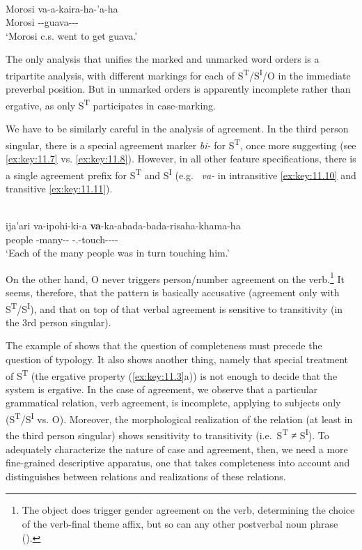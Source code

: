 \documentclass[output=paper]{langsci/langscibook}
\begin{document}
\ea%
    \label{ex:key:11.10}
    {\parencite[197]{ChapmanDerbyshire1991}}\\
    \gll Morosi  va-a-kaira-ha-’a-ha\\
        Morosi  \Tpl{}-\Vblz{}-guava-\Prt-\Asp-\Th{}\\
    \glt ‘Morosi c.s. went to get guava.’
\z

The only analysis that unifies the marked and unmarked word orders is a
tripartite analysis, with different markings for each of
S\textsuperscript{T}/S\textsuperscript{I}/O in the immediate preverbal
position. But in unmarked orders  is apparently incomplete rather than
ergative, as only S\textsuperscript{T} participates in case-marking.

We have to be similarly careful in the analysis of  agreement. In the
third person singular, there is a special agreement marker \emph{bi-} for
S\textsuperscript{T}, once more suggesting  (see \eqref{ex:key:11.7} vs. \eqref{ex:key:11.8}).
However, in all other feature specifications, there is a single agreement
prefix for S\textsuperscript{T} and S\textsuperscript{I} (e.g.\ \Tpl{}
\emph{va-} in intransitive \eqref{ex:key:11.10} and transitive \eqref{ex:key:11.11}).

\ea%
    \label{ex:key:11.11}  \parencite[281]{ChapmanDerbyshire1991}\\
    \gll ija'ari  va-ipohi-ki-a \textbf{va}-ka-abada-bada-risaha-khama-ha\\
        people  \Tpl{}-many-\Desc-\Erg{} \Tpl-\Tr.\Distr{}-touch-\Red{}-\Iter-\Distr-\Th{}\\
    \glt ‘Each of the many people was in turn touching him.’
\z

On the other hand, O never triggers person/number agreement on the
verb.\footnote{The object does trigger gender agreement on the verb,
determining the choice of the verb-final theme affix, but so can any other
postverbal noun phrase (\citealt[288]{ChapmanDerbyshire1991}).} It seems,
therefore, that the pattern is basically accusative (agreement only with
S\textsuperscript{T}/S\textsuperscript{I}), and that on top of that verbal
agreement is sensitive to transitivity (in the 3rd person singular).

The example of  shows that the question of completeness must precede the
question of  typology. It also shows another thing, namely that
special treatment of S\textsuperscript{T} (the ergative property (\ref{ex:key:11.3}a)) is not
enough to decide that the system is ergative. In the case of  agreement,
we observe that a particular grammatical relation, verb agreement, is
incomplete, applying to subjects only
(S\textsuperscript{T}/S\textsuperscript{I} vs. O). Moreover, the morphological
realization of the relation (at least in the third person singular) shows
sensitivity to transitivity (i.e.\ S\textsuperscript{T} ≠ S\textsuperscript{I}).
To adequately characterize the nature of  case and agreement, then, we
need a more fine-grained descriptive apparatus, one that takes completeness
into account and distinguishes between relations and realizations of these
relations.
\end{document}
